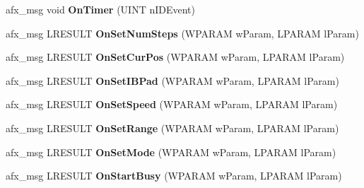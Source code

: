 \begin{DoxyCompactItemize}
\item 
\hypertarget{class_cx_prog_ctrl_a516d0e2b865ac7d8104db5027c0b8dfa}{afx\-\_\-msg void {\bfseries On\-Timer} (U\-I\-N\-T n\-I\-D\-Event)}\label{class_cx_prog_ctrl_a516d0e2b865ac7d8104db5027c0b8dfa}

\item 
\hypertarget{class_cx_prog_ctrl_ab19e4e6ec58a543ebe4563f8eed9f47c}{afx\-\_\-msg L\-R\-E\-S\-U\-L\-T {\bfseries On\-Set\-Num\-Steps} (W\-P\-A\-R\-A\-M w\-Param, L\-P\-A\-R\-A\-M l\-Param)}\label{class_cx_prog_ctrl_ab19e4e6ec58a543ebe4563f8eed9f47c}

\item 
\hypertarget{class_cx_prog_ctrl_ae5bca37a8cf816679ba5c39f81bbdc48}{afx\-\_\-msg L\-R\-E\-S\-U\-L\-T {\bfseries On\-Set\-Cur\-Pos} (W\-P\-A\-R\-A\-M w\-Param, L\-P\-A\-R\-A\-M l\-Param)}\label{class_cx_prog_ctrl_ae5bca37a8cf816679ba5c39f81bbdc48}

\item 
\hypertarget{class_cx_prog_ctrl_aeafc5d9469dba972ebb9a5592042b34b}{afx\-\_\-msg L\-R\-E\-S\-U\-L\-T {\bfseries On\-Set\-I\-B\-Pad} (W\-P\-A\-R\-A\-M w\-Param, L\-P\-A\-R\-A\-M l\-Param)}\label{class_cx_prog_ctrl_aeafc5d9469dba972ebb9a5592042b34b}

\item 
\hypertarget{class_cx_prog_ctrl_aa230aa045b05098b87294e0879b3c7cb}{afx\-\_\-msg L\-R\-E\-S\-U\-L\-T {\bfseries On\-Set\-Speed} (W\-P\-A\-R\-A\-M w\-Param, L\-P\-A\-R\-A\-M l\-Param)}\label{class_cx_prog_ctrl_aa230aa045b05098b87294e0879b3c7cb}

\item 
\hypertarget{class_cx_prog_ctrl_a6bdcb9d2147d4b8a63fdb21760dee602}{afx\-\_\-msg L\-R\-E\-S\-U\-L\-T {\bfseries On\-Set\-Range} (W\-P\-A\-R\-A\-M w\-Param, L\-P\-A\-R\-A\-M l\-Param)}\label{class_cx_prog_ctrl_a6bdcb9d2147d4b8a63fdb21760dee602}

\item 
\hypertarget{class_cx_prog_ctrl_aa137cbebf276f4247be928176d7113ea}{afx\-\_\-msg L\-R\-E\-S\-U\-L\-T {\bfseries On\-Set\-Mode} (W\-P\-A\-R\-A\-M w\-Param, L\-P\-A\-R\-A\-M l\-Param)}\label{class_cx_prog_ctrl_aa137cbebf276f4247be928176d7113ea}

\item 
\hypertarget{class_cx_prog_ctrl_a21bb72e83dde99944fa6621e7085270f}{afx\-\_\-msg L\-R\-E\-S\-U\-L\-T {\bfseries On\-Start\-Busy} (W\-P\-A\-R\-A\-M w\-Param, L\-P\-A\-R\-A\-M l\-Param)}\label{class_cx_prog_ctrl_a21bb72e83dde99944fa6621e7085270f}


\end{DoxyCompactItemize}
